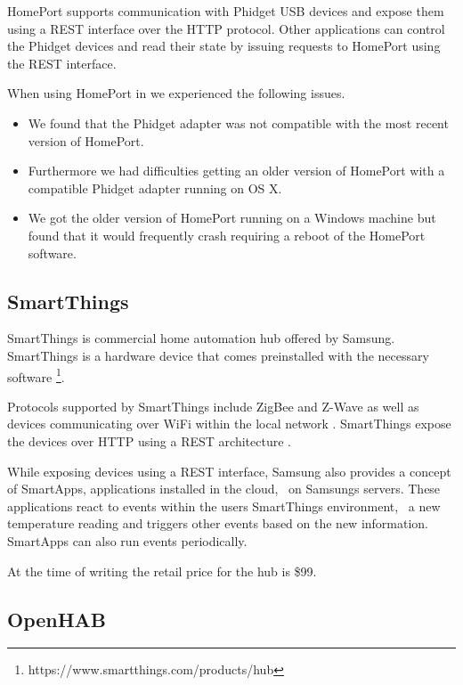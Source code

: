 HomePort supports communication with Phidget USB devices and expose them using a REST interface over the HTTP protocol. Other applications can control the Phidget devices and read their state by issuing requests to HomePort using the REST interface.

When using HomePort in \cite{prespecialisation} we experienced the following issues.

\begin{itemize}
\item We found that the Phidget adapter was not compatible with the most recent version of HomePort.
\item Furthermore we had difficulties getting an older version of HomePort with a compatible Phidget adapter running on OS X.
\item We got the older version of HomePort running on a Windows machine but found that it would frequently crash requiring a reboot of the HomePort software.
\end{itemize}

\subsection{SmartThings}
\label{sec:analysis:choice-of-hub:smartthings}

SmartThings \cite{SMARTTHINGS} is commercial home automation hub offered by Samsung. SmartThings is a hardware device that comes preinstalled with the necessary software \footnote{https://www.smartthings.com/products/hub}.

Protocols supported by SmartThings include ZigBee and Z-Wave as well as devices communicating over WiFi within the local network \cite{smartthings:compatible-products}. SmartThings expose the devices over HTTP using a REST architecture \cite{smartthings:developer}.

While exposing devices using a REST interface, Samsung also provides a concept of SmartApps, applications installed in the cloud, \ie~on Samsungs servers. These applications react to events within the users SmartThings environment, \ie~a new temperature reading and triggers other events based on the new information. SmartApps can also run events periodically.

At the time of writing the retail price for the hub is \$99.

\subsection{OpenHAB}
\label{sec:analysis:choice-of-hub:openhab}

